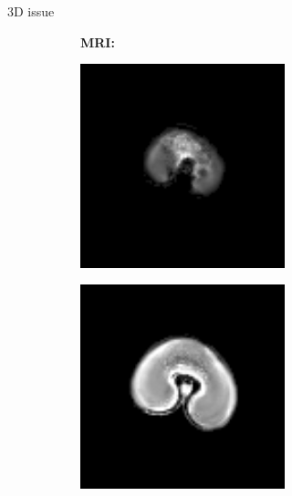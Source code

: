 \documentclass[10pt]{beamer}
\begin{document}
\begin{frame}{3D issue}
  \vspace{-0.3cm}
   \begin{figure}[ht]
     \centering
     \begin{subfigure}[b]{0.15\textwidth}  
       \textbf{MRI:}
     \end{subfigure}%
     \begin{subfigure}[c]{0.3\textwidth}
       \centering
       \includegraphics[width=0.65\textwidth]{fig/3D_density_aligned_manual0000}%
     \end{subfigure}%
     \begin{subfigure}[c]{0.3\textwidth}
       \centering
       \includegraphics[width=0.65\textwidth]{fig/3D_density_aligned_manual0003}%
     \end{subfigure}%
     \begin{subfigure}[c]{0.3\textwidth}
       \centering

\end{subfigure}
\end{figure}
\end{frame}
\end{document}
